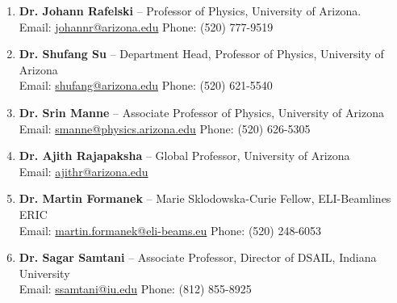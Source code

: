\documentclass[11pt]{article}
\begin{document}
{\normalsize
\begin{enumerate}[leftmargin=*,nosep]
    \item \textbf{Dr. Johann Rafelski} -- Professor of Physics, University of Arizona.\\
    Email: \href{mailto:johannr@arizona.edu}{johannr@arizona.edu} \quad Phone: (520) 777-9519
    \item \textbf{Dr. Shufang Su} -- Department Head, Professor of Physics, University of Arizona\\
    Email: \href{mailto:shufang@arizona.edu}{shufang@arizona.edu} \quad Phone: (520) 621-5540
    \item \textbf{Dr. Srin Manne} -- Associate Professor of Physics, University of Arizona\\
    Email: \href{mailto:smanne@physics.arizona.edu}{smanne@physics.arizona.edu} \quad Phone: (520) 626-5305
    \item \textbf{Dr. Ajith Rajapaksha} -- Global Professor, University of Arizona\\
    Email: \href{mailto:ajithr@arizona.edu}{ajithr@arizona.edu}
    \item \textbf{Dr. Martin Formanek} -- Marie Sklodowska-Curie Fellow, ELI-Beamlines ERIC\\
    Email: \href{mailto:martin.formanek@eli-beams.eu}{martin.formanek@eli-beams.eu} \quad Phone: (520) 248-6053
    \item \textbf{Dr. Sagar Samtani} -- Associate Professor, Director of DSAIL, Indiana University\\
    Email: \href{mailto:ssamtani@iu.edu}{ssamtani@iu.edu} \quad Phone: (812) 855-8925
\end{enumerate}
}

\end{document}

